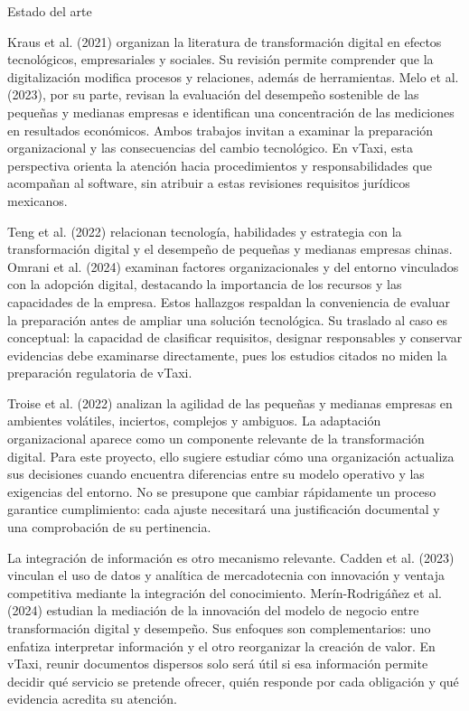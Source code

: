 {Estado del arte


Kraus et al. (2021) organizan la literatura de transformación digital en efectos tecnológicos, empresariales y sociales. Su revisión permite comprender que la digitalización modifica procesos y relaciones, además de herramientas. Melo et al. (2023), por su parte, revisan la evaluación del desempeño sostenible de las pequeñas y medianas empresas e identifican una concentración de las mediciones en resultados económicos. Ambos trabajos invitan a examinar la preparación organizacional y las consecuencias del cambio tecnológico. En vTaxi, esta perspectiva orienta la atención hacia procedimientos y responsabilidades que acompañan al software, sin atribuir a estas revisiones requisitos jurídicos mexicanos.


Teng et al. (2022) relacionan tecnología, habilidades y estrategia con la transformación digital y el desempeño de pequeñas y medianas empresas chinas. Omrani et al. (2024) examinan factores organizacionales y del entorno vinculados con la adopción digital, destacando la importancia de los recursos y las capacidades de la empresa. Estos hallazgos respaldan la conveniencia de evaluar la preparación antes de ampliar una solución tecnológica. Su traslado al caso es conceptual: la capacidad de clasificar requisitos, designar responsables y conservar evidencias debe examinarse directamente, pues los estudios citados no miden la preparación regulatoria de vTaxi.


Troise et al. (2022) analizan la agilidad de las pequeñas y medianas empresas en ambientes volátiles, inciertos, complejos y ambiguos. La adaptación organizacional aparece como un componente relevante de la transformación digital. Para este proyecto, ello sugiere estudiar cómo una organización actualiza sus decisiones cuando encuentra diferencias entre su modelo operativo y las exigencias del entorno. No se presupone que cambiar rápidamente un proceso garantice cumplimiento: cada ajuste necesitará una justificación documental y una comprobación de su pertinencia.


La integración de información es otro mecanismo relevante. Cadden et al. (2023) vinculan el uso de datos y analítica de mercadotecnia con innovación y ventaja competitiva mediante la integración del conocimiento. Merín-Rodrigáñez et al. (2024) estudian la mediación de la innovación del modelo de negocio entre transformación digital y desempeño. Sus enfoques son complementarios: uno enfatiza interpretar información y el otro reorganizar la creación de valor. En vTaxi, reunir documentos dispersos solo será útil si esa información permite decidir qué servicio se pretende ofrecer, quién responde por cada obligación y qué evidencia acredita su atención.


}
